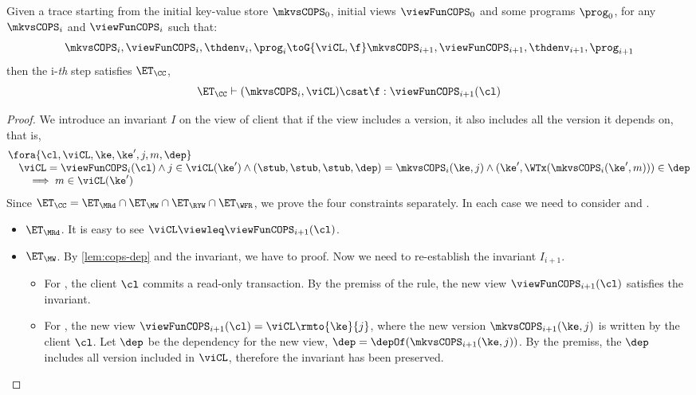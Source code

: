\begin{theorem}
\label{thm:cops-cc}
    Given a trace starting from the initial key-value store \( \mkvsCOPS_0 \), initial views \( \viewFunCOPS_0 \) and some programs \( \prog_0 \), for any \( \mkvsCOPS_i \) and \( \viewFunCOPS_i \)  such that: 
    \[
        \mkvsCOPS_i, \viewFunCOPS_i, \thdenv_i, \prog_i \toG{\viCL,\f} \mkvsCOPS_{i+1}, \viewFunCOPS_{i+1}, \thdenv_{i+1}, \prog_{i+1} 
    \]
    then the i-\emph{th} step satisfies \( \ET_\CC \), \ie
    \[
        \ET_\CC \vdash ( \mkvsCOPS_i, \viCL ) \csat \f : \viewFunCOPS_{i+1}(\cl)
    \]
\end{theorem}
\begin{proof}
    We introduce an invariant \( I \) on the view of client that if the view includes a version, 
    it also includes all the version it depends on, that is,
    \[
        \begin{array}{@{}l@{}}
        \fora{\cl, \viCL,\ke,\ke',j,m,\dep} \\
        \quad \viCL = \viewFunCOPS_i(\cl) \land j \in \viCL(\ke') 
        \land (\stub,\stub,\stub,\dep) = \mkvsCOPS_i(\ke,j)
        \land (\ke',\WTx(\mkvsCOPS_i(\ke',m))) \in \dep \\
        \qquad \implies m \in \viCL(\ke')
        \end{array}
    \]
    Since \( \ET_\CC = \ET_\MRd \cap \ET_\MW \cap \ET_\RYW \cap \ET_\WFR \), we prove the four constraints separately.
    In each case we need to consider  and .
    \begin{itemize}
        \item \( \ET_\MRd \). 
            It is easy to see \( \viCL \viewleq \viewFunCOPS_{i+1}(\cl) \).

        \item \( \ET_\MW \).
            By \cref{lem:cops-dep} and the invariant, we have to proof.
            Now we need to re-establish the invariant \( I_{i+1} \).
            \begin{itemize}
                \item 
                For , the client \( \cl \) commits a read-only transaction.
                By the premiss of the rule, the new view \( \viewFunCOPS_{i+1}(\cl) \) satisfies the invariant.
                \item For , the new view \( \viewFunCOPS_{i+1}(\cl) = \viCL\rmto{\ke}{j} \),
                where the new version \( \mkvsCOPS_{i+1}(\ke,j)\) is written by the client \( \cl \).
                Let \( \dep \) be the dependency for the new view, \ie \( \dep = \depOf(\mkvsCOPS_{i+1}(\ke,j)) \).
                By the premiss, the \( \dep \) includes all version included in \( \viCL \), 
                therefore the invariant has been preserved.
            \end{itemize}


\end{itemize}
\end{proof}
